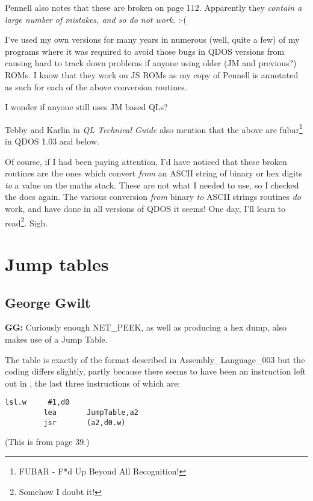Pennell also notes that these are broken on page 112. Apparently they \emph{contain a large number of mistakes, and so do not work}. :-(

I've used my own versions for many years in numerous (well, quite a few) of my programs where it was required to avoid those bugs in QDOS versions from causing hard to track down problems if anyone using older (JM and previous?) ROMs. I know that they work on JS ROMs as my copy of Pennell is annotated as such for each of the above conversion routines.

I wonder if anyone still uses JM based QLs?

Tebby and Karlin in \emph{QL Technical Guide} also mention that the above are fubar\footnote{FUBAR - F*d Up Beyond All Recognition!} in QDOS 1.03 and below.

Of course, if I had been paying attention, I'd have noticed that these broken routines are the ones which convert \emph{from} an ASCII string of binary or hex digits \emph{to} a value on the maths stack. These are not what I needed to use, so I checked the docs again. The various conversion \emph{from} binary \emph{to} ASCII strings routines \emph{do} work, and have done in all versions of QDOS it seems! One day, I'll learn to read\footnote{Somehow I doubt it!}. Sigh.

\section{Jump tables}

\subsection{George Gwilt}

\textbf{GG: }Curiously enough NET\_PEEK, as well as producing a hex dump, also makes use of a Jump Table.

The table is exactly of the format described in Assembly\_Language\_003 but the coding differs slightly, partly because there seems to have been an
instruction left out in , the last three instructions of which are:

\begin{lstlisting}[firstnumber=27,caption={Jump Table Code Extract}]
         lsl.w     #1,d0
         lea       JumpTable,a2
         jsr       (a2,d0.w)
\end{lstlisting}

(This is from page 39.) 

